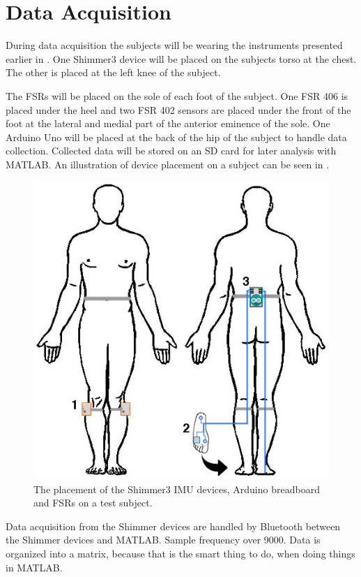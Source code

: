 \section{Data Acquisition}

During data acquisition the subjects will be wearing the instruments presented earlier in . One Shimmer3 device will be placed on the subjects torso at the chest. The other is placed at the left knee of the subject. 

The FSRs will be placed on the sole of each foot of the subject. One FSR 406 is placed under the heel and two FSR 402 sensors are placed under the front of the foot at the lateral and medial part of the anterior eminence of the sole. One Arduino Uno will be placed at the back of the hip of the subject to handle data collection. Collected data will be stored on an SD card for later analysis with MATLAB. An illustration of device placement on a subject can be seen in . 


\begin{figure}[H]
	\includegraphics[width=.6\textwidth]{figures/bodySysSetup}
	\caption{The placement of the Shimmer3 IMU devices, Arduino breadboard and FSRs on a test subject.}
	\label{fig:bodySysSetup}  %
\end{figure}

Data acquisition from the Shimmer devices are handled by Bluetooth between the Shimmer devices and MATLAB. Sample frequency over 9000. Data is organized into a matrix, because that is the smart thing to do, when doing things in MATLAB.

